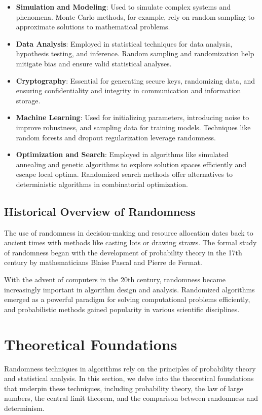 \documentclass[12pt]{book} %
\begin{document}
\begin{itemize}
    \item \textbf{Simulation and Modeling}: Used to simulate complex systems and phenomena. Monte Carlo methods, for example, rely on random sampling to approximate solutions to mathematical problems.
    
    \item \textbf{Data Analysis}: Employed in statistical techniques for data analysis, hypothesis testing, and inference. Random sampling and randomization help mitigate bias and ensure valid statistical analyses.
    
    \item \textbf{Cryptography}: Essential for generating secure keys, randomizing data, and ensuring confidentiality and integrity in communication and information storage.
    
    \item \textbf{Machine Learning}: Used for initializing parameters, introducing noise to improve robustness, and sampling data for training models. Techniques like random forests and dropout regularization leverage randomness.
    
    \item \textbf{Optimization and Search}: Employed in algorithms like simulated annealing and genetic algorithms to explore solution spaces efficiently and escape local optima. Randomized search methods offer alternatives to deterministic algorithms in combinatorial optimization.
\end{itemize}

\subsection{Historical Overview of Randomness}

The use of randomness in decision-making and resource allocation dates back to ancient times with methods like casting lots or drawing straws. The formal study of randomness began with the development of probability theory in the 17th century by mathematicians Blaise Pascal and Pierre de Fermat.

With the advent of computers in the 20th century, randomness became increasingly important in algorithm design and analysis. Randomized algorithms emerged as a powerful paradigm for solving computational problems efficiently, and probabilistic methods gained popularity in various scientific disciplines.


\section{Theoretical Foundations}
Randomness techniques in algorithms rely on the principles of probability theory and statistical analysis. In this section, we delve into the theoretical foundations that underpin these techniques, including probability theory, the law of large numbers, the central limit theorem, and the comparison between randomness and determinism.
\end{document}
